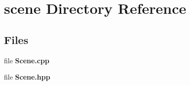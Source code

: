 \section{scene Directory Reference}
\label{dir_fd40b43fc4c1e00689c4b0cc7f9f9515}
\subsection*{Files}
\begin{DoxyCompactItemize}
\item 
file \textbf{ Scene.\+cpp}
\item 
file \textbf{ Scene.\+hpp}
\end{DoxyCompactItemize}
